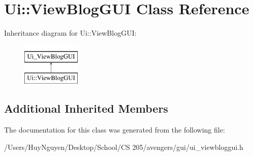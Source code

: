 \hypertarget{classUi_1_1ViewBlogGUI}{}\section{Ui\+:\+:View\+Blog\+G\+UI Class Reference}
\label{classUi_1_1ViewBlogGUI}
Inheritance diagram for Ui\+:\+:View\+Blog\+G\+UI\+:\begin{figure}[H]
\begin{center}
\leavevmode
\includegraphics[height=2.000000cm]{classUi_1_1ViewBlogGUI}
\end{center}
\end{figure}
\subsection*{Additional Inherited Members}


The documentation for this class was generated from the following file\+:\begin{DoxyCompactItemize}
\item 
/\+Users/\+Huy\+Nguyen/\+Desktop/\+School/\+C\+S 205/avengers/gui/ui\+\_\+viewbloggui.\+h\end{DoxyCompactItemize}

